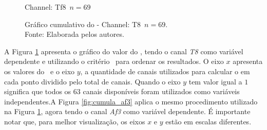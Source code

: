 \begin{figure}[ht]
\begin{minipage}[b]{0.45\textwidth}
    \caption{Channel: Tf8~$n = 69$}
  \end{minipage}
  \captionsetup{justification=centering}
  \caption{Gráfico cumulativo do \dmc - Channel: T8~$n = 69$.\\Fonte: Elaborada pelos autores.}\label{fig:cumula_t8}
\end{figure}

A Figura \ref{fig:cumula_t8} apresenta o gráfico do valor do \dmc, tendo o canal \emph{T8} como variável dependente e utilizando o critério \pdcca~para ordenar os resultados. O eixo $x$ apresenta os valores do \dmc~e o eixo $y$, a quantidade de canais utilizados para calcular o \dmc em cada ponto dividido pelo total de canais. Quando o eixo $y$ tem valor igual a $1$ significa que todos os $63$ canais disponíveis foram utilizados como variáveis independentes.A Figura \ref{fig:cumula_af3} aplica o mesmo procedimento utilizado na Figura \ref{fig:cumula_t8}, agora tendo o canal \emph{Af3} como variável dependente. É importante notar que, para melhor visualização, os eixos $x$ e $y$ estão em escalas diferentes.


